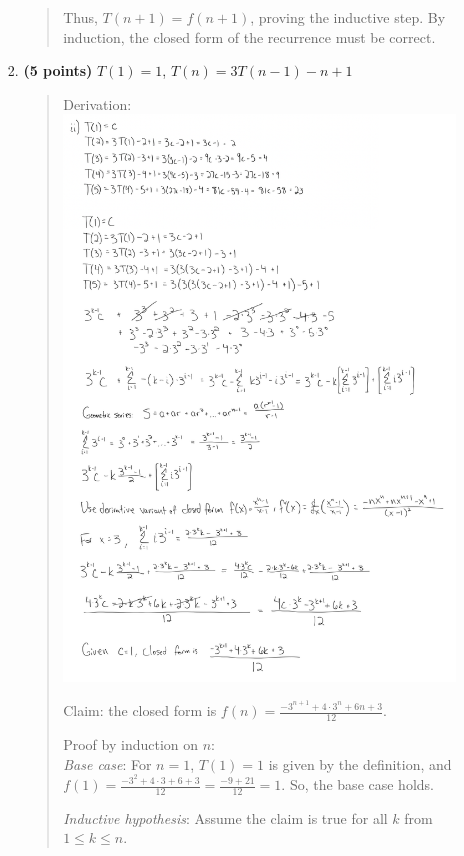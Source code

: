 \documentclass[11pt]{article}
\begin{document}
\begin{enumerate}[leftmargin=*]
\begin{enumerate}
\begin{enumerate}
\begin{quote}
          \medskip
          Thus, $T(n + 1) = f(n + 1)$, proving the inductive step. By induction, the closed form of the recurrence must be correct. 
        \end{quote}
        \item
        {\bf (5 points)}
        $T(1) = 1$, $T(n) = 3T(n-1) - n + 1$
        \begin{quote}
          \color{purple}
          Derivation: \\ 
          \includegraphics[width=0.8\linewidth]{"./pics/4aii.png"}

          \medskip
          Claim: the closed form is $f(n) = \frac{-3^{n + 1} + 4 \cdot 3^n + 6n + 3}{12}$.


          \medskip
          Proof by induction on $n$: \\ 
          \textit{Base case}: For $n = 1$, $T(1) = 1$ is given by the definition, and $f(1) = \frac{-3^2 + 4 \cdot 3 + 6 + 3}{12} = \frac{-9 + 21}{12} = 1$. So, the base case holds.

          \medskip
          \textit{Inductive hypothesis}: Assume the claim is true for all $k$ from $1 \leq k \leq n$.


\end{quote}
\end{enumerate}
\end{enumerate}
\end{enumerate}
\end{document}

